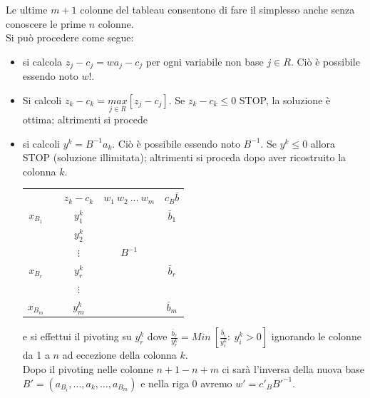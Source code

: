 Le ultime $m+1$ colonne del tableau consentono di fare il simplesso anche senza conoscere le prime $n$ colonne.\\
Si può procedere come segue:
\begin{itemize}
	\item si calcola $z_{j}-c_{j}=w a_{j}-c_{j}$ per ogni variabile non base $j\in R$. Ciò è possibile essendo noto $w$!.
	\item Si calcoli $z_{k}-c_{k}=\underset{j\in R}{max}[z_{j}-c_{j}]$. Se $z_{k}-c_{k}\le 0$ STOP, la soluzione è ottima; altrimenti si procede
	\item si calcoli $y^{k}=B^{-1}a_{k}$. Ciò è possibile essendo noto $B^{-1}$. Se $y^{k}\le 0$ allora STOP (soluzione illimitata); altrimenti si proceda dopo aver ricostruito la colonna $k$.
	\begin{table}[h]
		\centering
		\begin{tabular}{c|c|c|c|c|}
			\cline{2-5}
			& & $z_{k}-c_{k}$ & $w_{1}\ w_{2}\ \dots\ w_{m}$ & $c_{B}\bar{b}$ \\ \cline{2-5}
			$x_{B_{1}}$ & & $y^{k}_{1}$ & & $\bar{b}_{1}$ \\
			&  & $y^{k}_{2}$ & & \\
			&  & $\vdots$ & $B^{-1}$ & \\
			$x_{B_{r}}$ & & $y^{k}_{r}$ &  & $\bar{b}_{r}$ \\
			&  & $\vdots$ &  & \\
			$x_{B_{m}}$ & & $y^{k}_{m}$ & & $\bar{b}_{m}$ \\ \cline{2-5}
		\end{tabular}
	\end{table}
	e si effettui il pivoting su $y_{r}^{k}$ dove $\frac{\bar{b}_{r}}{y_{r}^{k}}=Min\ [\frac{\bar{b}_{i}}{y^{k}_{i}}:\ y_{i}^{k}>0]$ ignorando le colonne da 1 a $n$ ad eccezione della colonna $k$.\\
	Dopo il pivoting nelle colonne $n+1-n+m$ ci sarà l'inversa della nuova base $B'=(a_{B_{i}},\dots,a_{k},\dots,a_{B_{m}})$ e nella riga 0 avremo $w'=c'_{B}B'^{-1}$.
\end{itemize}


